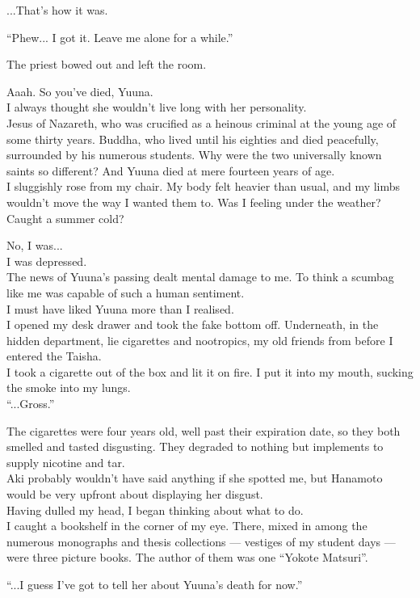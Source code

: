 ...That's how it was.

``Phew... I got it. Leave me alone for a while.''

The priest bowed out and left the room.

Aaah. So you've died, Yuuna.\\
I always thought she wouldn't live long with her personality.\\
Jesus of Nazareth, who was crucified as a heinous criminal at the young age of some thirty years. Buddha, who lived until his eighties and died peacefully, surrounded by his numerous students. Why were the two universally known saints so different? And Yuuna died at mere fourteen years of age.\\
I sluggishly rose from my chair. My body felt heavier than usual, and my limbs wouldn't move the way I wanted them to. Was I feeling under the weather? Caught a summer cold?

No, I was...\\
I was depressed.\\
The news of Yuuna's passing dealt mental damage to me. To think a scumbag like me was capable of such a human sentiment.\\
I must have liked Yuuna more than I realised.\\
I opened my desk drawer and took the fake bottom off. Underneath, in the hidden department, lie cigarettes and nootropics, my old friends from before I entered the Taisha.\\
I took a cigarette out of the box and lit it on fire. I put it into my mouth, sucking the smoke into my lungs.\\
``...Gross.''

The cigarettes were four years old, well past their expiration date, so they both smelled and tasted disgusting. They degraded to nothing but implements to supply nicotine and tar. \\
Aki probably wouldn't have said anything if she spotted me, but Hanamoto would be very upfront about displaying her disgust. \\
Having dulled my head, I began thinking about what to do. \\
I caught a bookshelf in the corner of my eye. There, mixed in among the numerous monographs and thesis collections --- vestiges of my student days --- were three picture books. The author of them was one ``Yokote Matsuri''.

``...I guess I've got to tell her about Yuuna's death for now.''

